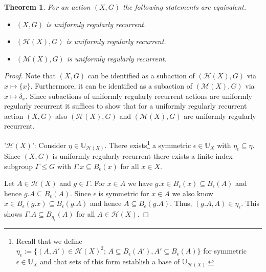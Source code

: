 \documentclass[12pt, reqno]{amsart}
\newtheorem{theorem}{Theorem}[section]
\theoremstyle{definition}
\theoremstyle{remark}
\numberwithin{equation}{section}
\theoremstyle{theorem}
\theoremstyle{remark}
\def\hyper{{\mathcal{H}}}
\begin{document}
\begin{theorem}
\label{the:HMinheritanceUniformRegularRecurrence}
    For an action $(X,G)$ the following statements are equivalent. 
    \begin{itemize}
        \item[(i)] $(X,G)$ is uniformly regularly recurrent. 
        \item[(ii)] $(\hyper(X),G)$ is uniformly regularly recurrent. 
        \item[(iii)] $(\mathcal{M}(X),G)$ is uniformly regularly recurrent.
    \end{itemize}
\end{theorem}
\begin{proof}
    Note that $(X,G)$ can be identified as a subaction of $(\hyper(X),G)$ via $x\mapsto \{x\}$. Furthermore, it can be identified as a subaction of $(\mathcal{M}(X),G)$ via $x\mapsto \delta_x$. 
    Since subactions of uniformly regularly recurrent actions are uniformly regularly recurrent it suffices to show that for a uniformly regularly recurrent action $(X,G)$ also $(\hyper(X),G)$ and $(\mathcal{M}(X),G)$ are uniformly regularly recurrent. 

'$\hyper(X)$':
    Consider $\eta\in \mathbb{U}_{\hyper(X)}$. 
    There exists\footnote{
        Recall that we define 
        $\eta_\epsilon
        :=\{(A,A')\in \hyper(X)^2;\, A\subseteq B_\epsilon(A'), A'\subseteq B_\epsilon(A)\}$ for symmetric $\epsilon\in \mathbb{U}_X$ and that sets of this form establish a base of $\mathbb{U}_{\hyper(X)}$.
    } a symmetric $\epsilon\in \mathbb{U}_X$ with 
    $\eta_\epsilon\subseteq \eta$. 
    Since $(X,G)$ is uniformly regularly recurrent there exists a finite index subgroup $\Gamma\leq G$ with $\Gamma.x\subseteq B_\epsilon(x)$ for all $x\in X$. 

    Let $A\in \hyper(X)$ and $g\in \Gamma$. 
    For $x\in A$ we have $g.x\in B_\epsilon(x)\subseteq B_\epsilon(A)$ and hence $g.A\subseteq B_\epsilon(A)$. 
    Since $\epsilon$ is symmetric for $x\in A$ we also know $x\in B_\epsilon(g.x)\subseteq B_\epsilon(g.A)$ and hence $A\subseteq B_\epsilon(g.A)$. 
    Thus, $(g.A,A)\in \eta_\epsilon$. 
    This shows $\Gamma.A\subseteq B_{\eta_\epsilon}(A)$ for all $A\in \hyper(X)$. 


\end{proof}
\end{document}

